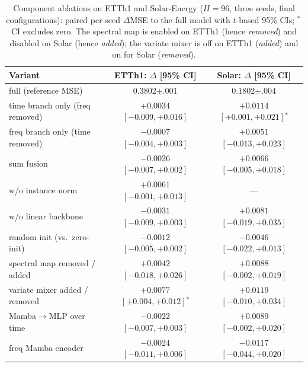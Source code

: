 \documentclass[review,12pt]{elsarticle}
\begin{document}
\begin{table}[tb]
\centering
\caption{Component ablations on ETTh1 and Solar-Energy ($H{=}96$, three
seeds, final configurations): paired per-seed $\Delta$MSE to the full
model with $t$-based 95\% CIs; $^{*}$\,CI excludes zero. The spectral map
is enabled on ETTh1 (hence \emph{removed}) and disabled on Solar (hence
\emph{added}); the variate mixer is off on ETTh1 (\emph{added}) and on
for Solar (\emph{removed}).}
\label{tab:ablation}
\scriptsize
\setlength{\tabcolsep}{3pt}
\begin{tabular}{@{}lcc@{}}
\toprule
Variant & ETTh1: $\Delta$ [95\% CI] & Solar: $\Delta$ [95\% CI] \\
\midrule
full (reference MSE) & $0.3802{\scriptstyle\pm.001}$ & $0.1802{\scriptstyle\pm.004}$ \\
\;\;time branch only (freq removed) & $+0.0034$ $[-0.009,+0.016]$ & $+0.0114$ $[+0.001,+0.021]$$^{*}$ \\
\;\;freq branch only (time removed) & $-0.0007$ $[-0.004,+0.003]$ & $+0.0051$ $[-0.013,+0.023]$ \\
\;\;sum fusion & $-0.0026$ $[-0.007,+0.002]$ & $+0.0066$ $[-0.005,+0.018]$ \\
\;\;w/o instance norm & $+0.0061$ $[-0.001,+0.013]$ & --- \\
\;\;w/o linear backbone & $-0.0031$ $[-0.009,+0.003]$ & $+0.0081$ $[-0.019,+0.035]$ \\
\;\;random init (vs.\ zero-init) & $-0.0012$ $[-0.005,+0.002]$ & $-0.0046$ $[-0.022,+0.013]$ \\
\;\;spectral map removed / added & $+0.0042$ $[-0.018,+0.026]$ & $+0.0088$ $[-0.002,+0.019]$ \\
\;\;variate mixer added / removed & $+0.0077$ $[+0.004,+0.012]$$^{*}$ & $+0.0119$ $[-0.010,+0.034]$ \\
\;\;Mamba$\rightarrow$MLP over time & $-0.0022$ $[-0.007,+0.003]$ & $+0.0089$ $[-0.002,+0.020]$ \\
\;\;freq Mamba encoder & $-0.0024$ $[-0.011,+0.006]$ & $-0.0117$ $[-0.044,+0.020]$ \\
\bottomrule
\end{tabular}
\end{table}
\end{document}
